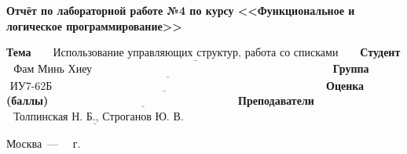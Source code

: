 \begin{titlepage}
	
	\begin{center}
		\Large\textbf{Отчёт по лабораторной работе №4 по курсу <<Функциональное и логическое программирование>>}
	\end{center}
	
	\bigskip\bigskip
	
	\noindent\textbf{Тема} $\underline{\text{~~~~~Использование управляющих структур, работа со списками~~~~~}}$\newline\newline\newline
	\noindent\textbf{Студент} $\underline{\text{~~Фам Минь Хиеу~~~~~~~~~~~~~~~~~~~~~~~~~~~~~~~~~~~~~~~~~~~~~~~~~~~~~~~~~~~~~~~~~}}$\newline\newline
	\noindent\textbf{Группа} $\underline{\text{~ИУ7-62Б~~~~~~~~~~~~~~~~~~~~~~~~~~~~~~~~~~~~~~~~~~~~~~~~~~~~~~~~~~~~~~~~~~~~~~~~~~}}$\newline\newline
	\noindent\textbf{Оценка (баллы)} $\underline{\text{~~~~~~~~~~~~~~~~~~~~~~~~~~~~~~~~~~~~~~~~~~~~~~~~~~}}$\newline\newline
	\noindent\textbf{Преподаватели} $\underline{\text{~~Толпинская~Н.~Б., Строганов~Ю.~В.}}$\newline
	
	\begin{center}
	\vfill
	Москва~---~\the\year
	~г.
	\end{center}

 \restoregeometry
\end{titlepage}
